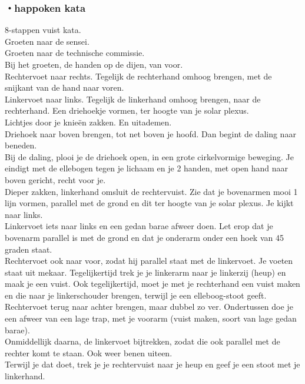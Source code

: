 \subsubsection{・happoken kata}
8-stappen vuist kata.\\
Groeten naar de sensei.\\
Groeten naar de technische commissie.\\
Bij het groeten, de handen op de dijen, van voor.\\
Rechtervoet naar rechts. Tegelijk de rechterhand omhoog brengen, met de snijkant van de hand naar voren.\\
Linkervoet naar links. Tegelijk de linkerhand omhoog brengen, naar de rechterhand. Een driehoekje vormen, ter hoogte van je solar plexus.\\
Lichtjes door je knie\"{e}n zakken. En uitademen.\\
Driehoek naar boven brengen, tot net boven je hoofd. Dan begint de daling naar beneden.\\
Bij de daling, plooi je de driehoek open, in een grote cirkelvormige beweging. Je eindigt met de ellebogen tegen je lichaam en je 2 handen, met open hand naar boven gericht, recht voor je.\\
Dieper zakken, linkerhand omsluit de rechtervuist. Zie dat je bovenarmen mooi 1 lijn vormen, parallel met de grond en dit ter hoogte van je solar plexus. Je kijkt naar links.\\
Linkervoet iets naar links en een gedan barae afweer doen. Let erop dat je bovenarm parallel is met de grond en dat je onderarm onder een hoek van 45 graden staat.\\
Rechtervoet ook naar voor, zodat hij parallel staat met de linkervoet. Je voeten staat uit mekaar. Tegelijkertijd trek je je linkerarm naar je linkerzij (heup) en maak je een vuist. Ook tegelijkertijd, moet je met je rechterhand een vuist maken en die naar je linkerschouder brengen, terwijl je een elleboog-stoot geeft.\\
Rechtervoet terug naar achter brengen, maar dubbel zo ver. Ondertussen doe je een afweer van een lage trap, met je voorarm (vuist maken, soort van lage gedan barae).\\
Onmiddellijk daarna, de linkervoet bijtrekken, zodat die ook parallel met de rechter komt te staan. Ook weer benen uiteen.\\
Terwijl je dat doet, trek je je rechtervuist naar je heup en geef je een stoot met je linkerhand.\\
